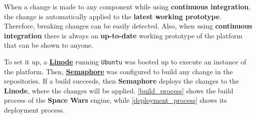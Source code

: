 \documentclass[a4paper,11pt,titlepage,abstract,numbers=noenddot,automark,mnsy,intlimits,rgb,dvipsnames]{report}
\begin{document}
When a change is made to any component while using \textbf{continuous integration}, the change is automatically applied to
the \textbf{latest working prototype}. Therefore, breaking changes can be easily detected. Also, when using  \textbf{continuous
integration} there is always an \textbf{up-to-date} working prototype of the platform that can be shown to anyone.

To set it up, a \href{http://linode.com/}{\textbf{Linode}} running \texttt{Ubuntu} was booted up to execute an instance of
the platform. Then, \href{http://semaphoreci.com/}{\textbf{Semaphore}} was configured to build any change in the
repositories. If a build succeeds, then \textbf{Semaphore} deploys the changes to the \textbf{Linode}, where the changes will
be applied. \autoref{build_process} shows the build process of the \textbf{Space Wars} engine, while
\autoref{deployment_process} shows its deployment process.
\end{document}
